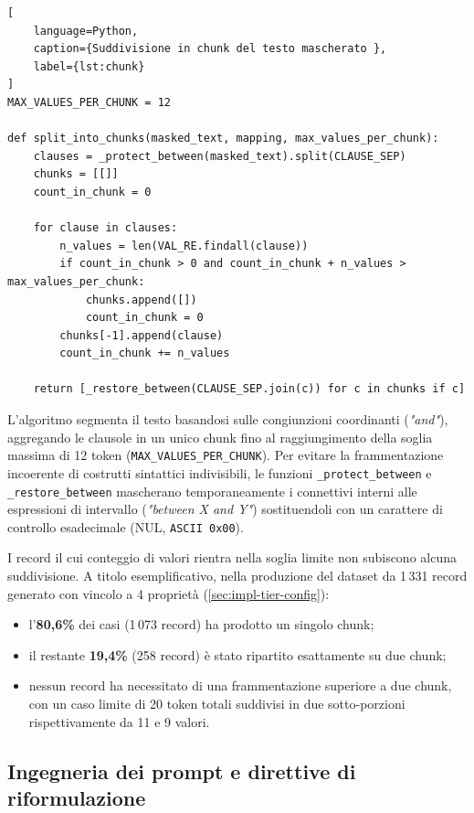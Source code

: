\documentclass[12pt,a4paper,openright,twoside]{book}
\begin{document}
\begin{lstlisting}[
    language=Python,
    caption={Suddivisione in chunk del testo mascherato },
    label={lst:chunk}
]
MAX_VALUES_PER_CHUNK = 12

def split_into_chunks(masked_text, mapping, max_values_per_chunk):
    clauses = _protect_between(masked_text).split(CLAUSE_SEP)
    chunks = [[]]
    count_in_chunk = 0
    
    for clause in clauses:
        n_values = len(VAL_RE.findall(clause))
        if count_in_chunk > 0 and count_in_chunk + n_values > max_values_per_chunk:
            chunks.append([])
            count_in_chunk = 0
        chunks[-1].append(clause)
        count_in_chunk += n_values
        
    return [_restore_between(CLAUSE_SEP.join(c)) for c in chunks if c]
\end{lstlisting}

L'algoritmo segmenta il testo basandosi sulle congiunzioni coordinanti
(\emph{"and"}), aggregando le clausole in un unico chunk fino al raggiungimento
della soglia massima di 12 token (\texttt{MAX\_VALUES\_PER\_CHUNK}). Per evitare
la frammentazione incoerente di costrutti sintattici indivisibili, le funzioni
\texttt{\_protect\_between} e \texttt{\_restore\_between} mascherano
temporaneamente i connettivi interni alle espressioni di intervallo
(\emph{"between X and Y"}) sostituendoli con un carattere di controllo
esadecimale (NUL, \texttt{ASCII 0x00}).

I record il cui conteggio di valori rientra nella soglia limite non subiscono
alcuna suddivisione. A titolo esemplificativo, nella produzione del dataset da
1\,331 record generato con vincolo a 4 proprietà (\cref{sec:impl-tier-config}):
\begin{itemize}
    \item l'\textbf{80,6\%} dei casi (1\,073 record) ha prodotto un singolo
          chunk;
    \item il restante \textbf{19,4\%} (258 record) è stato ripartito esattamente
          su due chunk;
    \item nessun record ha necessitato di una frammentazione superiore a due
          chunk, con un caso limite di 20 token totali suddivisi in due
          sotto-porzioni rispettivamente da 11 e 9 valori.
\end{itemize}

\subsection{Ingegneria dei prompt e direttive di riformulazione}
\label{sec:impl-prompts}
\end{document}
